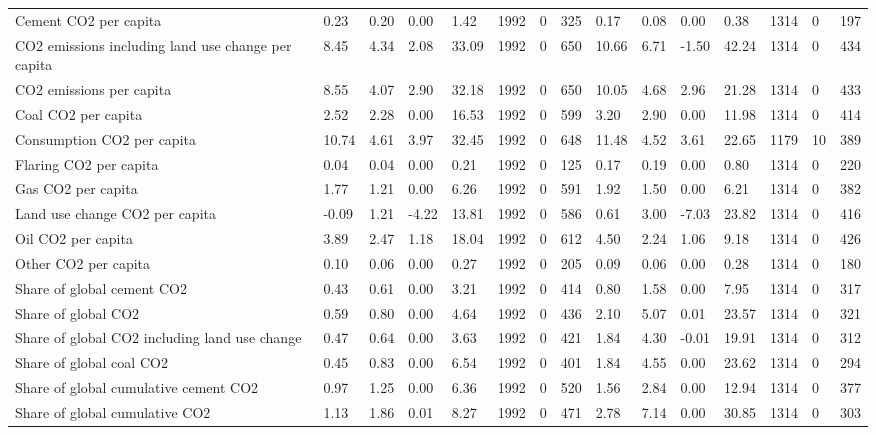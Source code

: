 \begin{longtable}{lllllllllllllll}
\addlinespace
Cement CO2 per capita & 0.23 & 0.20 & 0.00 & 1.42 & 1992 & 0 & 325 & 0.17 & 0.08 & 0.00 & 0.38 & 1314 & 0 & 197\\
CO2 emissions including land use change per capita & 8.45 & 4.34 & 2.08 & 33.09 & 1992 & 0 & 650 & 10.66 & 6.71 & -1.50 & 42.24 & 1314 & 0 & 434\\
CO2 emissions per capita & 8.55 & 4.07 & 2.90 & 32.18 & 1992 & 0 & 650 & 10.05 & 4.68 & 2.96 & 21.28 & 1314 & 0 & 433\\
Coal CO2 per capita & 2.52 & 2.28 & 0.00 & 16.53 & 1992 & 0 & 599 & 3.20 & 2.90 & 0.00 & 11.98 & 1314 & 0 & 414\\
Consumption CO2 per capita & 10.74 & 4.61 & 3.97 & 32.45 & 1992 & 0 & 648 & 11.48 & 4.52 & 3.61 & 22.65 & 1179 & 10 & 389\\
\addlinespace
Flaring CO2 per capita & 0.04 & 0.04 & 0.00 & 0.21 & 1992 & 0 & 125 & 0.17 & 0.19 & 0.00 & 0.80 & 1314 & 0 & 220\\
Gas CO2 per capita & 1.77 & 1.21 & 0.00 & 6.26 & 1992 & 0 & 591 & 1.92 & 1.50 & 0.00 & 6.21 & 1314 & 0 & 382\\
Land use change CO2 per capita & -0.09 & 1.21 & -4.22 & 13.81 & 1992 & 0 & 586 & 0.61 & 3.00 & -7.03 & 23.82 & 1314 & 0 & 416\\
Oil CO2 per capita & 3.89 & 2.47 & 1.18 & 18.04 & 1992 & 0 & 612 & 4.50 & 2.24 & 1.06 & 9.18 & 1314 & 0 & 426\\
Other CO2 per capita & 0.10 & 0.06 & 0.00 & 0.27 & 1992 & 0 & 205 & 0.09 & 0.06 & 0.00 & 0.28 & 1314 & 0 & 180\\
\addlinespace
Share of global cement CO2 & 0.43 & 0.61 & 0.00 & 3.21 & 1992 & 0 & 414 & 0.80 & 1.58 & 0.00 & 7.95 & 1314 & 0 & 317\\
Share of global CO2 & 0.59 & 0.80 & 0.00 & 4.64 & 1992 & 0 & 436 & 2.10 & 5.07 & 0.01 & 23.57 & 1314 & 0 & 321\\
Share of global CO2 including land use change & 0.47 & 0.64 & 0.00 & 3.63 & 1992 & 0 & 421 & 1.84 & 4.30 & -0.01 & 19.91 & 1314 & 0 & 312\\
Share of global coal CO2 & 0.45 & 0.83 & 0.00 & 6.54 & 1992 & 0 & 401 & 1.84 & 4.55 & 0.00 & 23.62 & 1314 & 0 & 294\\
Share of global cumulative cement CO2 & 0.97 & 1.25 & 0.00 & 6.36 & 1992 & 0 & 520 & 1.56 & 2.84 & 0.00 & 12.94 & 1314 & 0 & 377\\
\addlinespace
Share of global cumulative CO2 & 1.13 & 1.86 & 0.01 & 8.27 & 1992 & 0 & 471 & 2.78 & 7.14 & 0.00 & 30.85 & 1314 & 0 & 303\\

\end{longtable}
